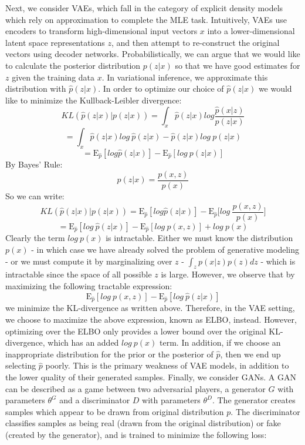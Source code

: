 \documentclass[a4paper]{article}
\begin{document}
\begin{enumerate}
{Next, we consider VAEs, which fall in the category of explicit density models which rely on approximation to complete the MLE task. Intuitively, VAEs use encoders to transform high-dimensional input vectors $x$ into a lower-dimensional latent space representations $z$, and then attempt to re-construct the original vectors using decoder networks. Probabilistically, we can argue that we would like to calculate the posterior distribution $p \left(z|x \right) $ so that we have good estimates for $z$ given the training data $x$. In variational inference, we approximate this distribution with $\hat{p} \left( z|x \right)$. In order to optimize our choice of $ \hat{p} \left(z|x \right)$ we would like to minimize the Kullback-Leibler divergence:
$$KL\left( \hat{p} \left(z|x \right) |  p \left( z|x \right) \right)  = \int_{x} \hat{p}(z|x) log \frac{\hat{p}(x|z) }{p(z|x ) } $$
$$ = \int_{x} \hat{p}(z| x) log \ \hat{p}(z |x)  - \hat{p}(z| x) log \ p(z|x )  $$
$$ = \mathrm{E}_{\hat{p}} [ log  \hat{p}(z |x) ] - \mathrm{E}_{\hat{p}} [ log \ p (z | x) ]  $$
By Bayes' Rule:
$$ p (z|x) = \frac{p(x,z)}{p(x)}$$
So we can write:
$$KL\left( \hat{p} \left(z|x \right) |  p \left( z|x \right) \right) = \mathrm{E}_{\hat{p}} [ log  \hat{p}(z |x) ] - \mathrm{E}_{\hat{p}} \Big[ log \ \frac{p(x,z)}{p(x)} \Big] $$
$$ =   \mathrm{E}_{\hat{p}} [ log\  \hat{p}(z |x) ] - \mathrm{E}_{\hat{p}} [ log \ p(x,z) ] + log \ p(x)$$
Clearly the term $log \ p(x)$ is intractable. Either we must know the distribution $p(x)$ - in which case we have already solved the problem of generative modeling - or we must compute it by marginalizing over $z$ - $\int_z p(x|z) p(z) dz$ - which is intractable since the space of all possible $z$ is large. However, we observe that by maximizing the following tractable expression:
$$\mathrm{E}_{\hat{p}} [ log \ p(x,z) ] - \mathrm{E}_{\hat{p}} [ log\  \hat{p}(z |x) ] $$
we minimize the KL-divergence as written above. Therefore, in the VAE setting, we choose to maximize the above expression, known as ELBO, instead. However, optimizing over the ELBO only provides a lower bound over the original KL-divergence, which has an added $log \ p(x)$ term. In addition, if we choose an inappropriate distribution for the prior or the posterior of $\hat{p}$, then we end up selecting $\hat{p}$ poorly. This is the primary weakness of VAE models, in addition to the lower quality of their generated samples.
\newline
\newline
Finally, we consider GANs. A GAN can be described as a game between two adversarial players, a generator $G$ with parameters $\theta^G$ and a discriminator $D$ with parameters $\theta^D$. The generator creates samples which appear to be drawn from original distribution $p$. The discriminator classifies samples as being real (drawn from the original distribution) or fake (created by the generator), and is trained to minimize the following loss:
}
\end{enumerate}
\end{document}
